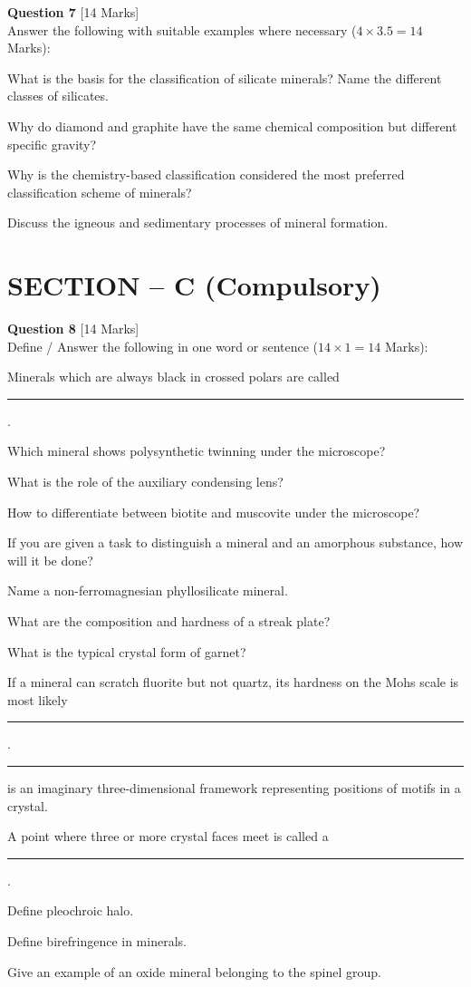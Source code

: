 \documentclass[11pt,a4paper]{article}
\begin{document}
\bigskip




\noindent   \textbf{Question 7} \hfill [14 Marks]\\
Answer the following with suitable examples where necessary ($4  \times 3.5 = 14$ Marks):

\begin{parts}
  \item What is the basis for the classification of silicate minerals? Name the different classes of silicates.
  \item Why do diamond and graphite have the same chemical composition but different specific gravity?
  \item Why is the chemistry-based classification considered the most preferred classification scheme of minerals?
  \item Discuss the igneous and sedimentary processes of mineral formation.
\end{parts}

\bigskip
\section*{SECTION -- C (Compulsory)}




\noindent   \textbf{Question 8} \hfill [14 Marks]\\
Define / Answer the following in one word or sentence ($14  \times 1 = 14$ Marks):

\begin{parts}
  \item Minerals which are always black in crossed polars are called \rule{3cm}{0.15mm}.
  \item Which mineral shows polysynthetic twinning under the microscope?
  \item What is the role of the auxiliary condensing lens?
  \item How to differentiate between biotite and muscovite under the microscope?
  \item If you are given a task to distinguish a mineral and an amorphous substance, how will it be done?
  \item Name a non-ferromagnesian phyllosilicate mineral.
  \item What are the composition and hardness of a streak plate?
  \item What is the typical crystal form of garnet?
  \item If a mineral can scratch fluorite but not quartz, its hardness on the Mohs scale is most likely \rule{2cm}{0.15mm}.
  \item \rule{3cm}{0.15mm} is an imaginary three-dimensional framework representing positions of motifs in a crystal.
  \item A point where three or more crystal faces meet is called a \rule{3cm}{0.15mm}.
  \item Define pleochroic halo.
  \item Define birefringence in minerals.
  \item Give an example of an oxide mineral belonging to the spinel group.
\end{parts}
\end{document}
